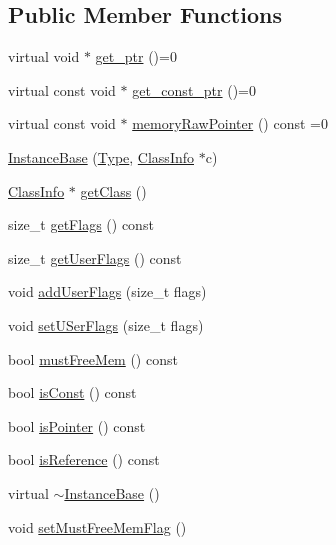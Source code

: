 \subsection*{Public Member Functions}
\begin{DoxyCompactItemize}
\item 
virtual void $\ast$ \hyperlink{classSLB_1_1InstanceBase_aaac2eb194d9008d586ce73ba7c692ce3}{get\+\_\+ptr} ()=0
\item 
virtual const void $\ast$ \hyperlink{classSLB_1_1InstanceBase_a09e8065c5b0e60abd0047354a3a3f246}{get\+\_\+const\+\_\+ptr} ()=0
\item 
virtual const void $\ast$ \hyperlink{classSLB_1_1InstanceBase_a38f8cb000eb25905fb74b875e3e23887}{memory\+Raw\+Pointer} () const =0
\item 
\hyperlink{classSLB_1_1InstanceBase_a760a0b96fabc5a2d2068352db5426cbe}{Instance\+Base} (\hyperlink{classSLB_1_1InstanceBase_a041cb4dfc80fe3f13e7b8b9fa83854ac}{Type}, \hyperlink{classSLB_1_1ClassInfo}{Class\+Info} $\ast$c)
\item 
\hyperlink{classSLB_1_1ClassInfo}{Class\+Info} $\ast$ \hyperlink{classSLB_1_1InstanceBase_a22e15156583f4032eff73f20383f0490}{get\+Class} ()
\item 
size\+\_\+t \hyperlink{classSLB_1_1InstanceBase_abbd98d96839b30c93f2afd5fbdd44c30}{get\+Flags} () const 
\item 
size\+\_\+t \hyperlink{classSLB_1_1InstanceBase_a840f726b62d5d788fc728bfdc967290b}{get\+User\+Flags} () const 
\item 
void \hyperlink{classSLB_1_1InstanceBase_ad69c6d043908da3c1a0802b84f3a4d2c}{add\+User\+Flags} (size\+\_\+t flags)
\item 
void \hyperlink{classSLB_1_1InstanceBase_ace493c6245486a261de03db20e13e65d}{set\+U\+Ser\+Flags} (size\+\_\+t flags)
\item 
bool \hyperlink{classSLB_1_1InstanceBase_a61c415ee34091ed67c425f7c4ac6e707}{must\+Free\+Mem} () const 
\item 
bool \hyperlink{classSLB_1_1InstanceBase_aacb071dea3f05c8a024160560051b734}{is\+Const} () const 
\item 
bool \hyperlink{classSLB_1_1InstanceBase_a2e101e0daebb0330314b11247890b0fa}{is\+Pointer} () const 
\item 
bool \hyperlink{classSLB_1_1InstanceBase_a72cea548129a3139e7a856c296d43411}{is\+Reference} () const 
\item 
virtual \hyperlink{classSLB_1_1InstanceBase_ae6bc91c17202c470a4c38ea972847ae0}{$\sim$\+Instance\+Base} ()
\item 
void \hyperlink{classSLB_1_1InstanceBase_ab1883f2aeb471b937e8d11ac5fa135e6}{set\+Must\+Free\+Mem\+Flag} ()
\end{DoxyCompactItemize}
